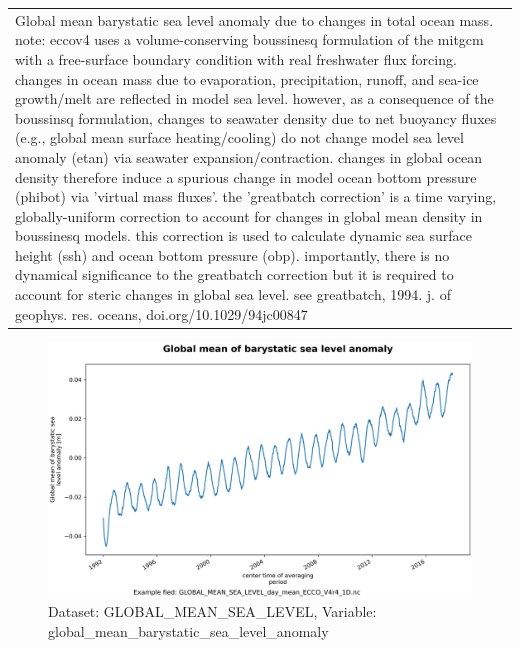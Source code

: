 \begin{longtable}{|m{}|m{}|m{}|m{}|}
\rowcolor{lightgray} \multicolumn{4}{|c|}{\textbf{Comments}} \\ \hline
\multicolumn{4}{|p{1\textwidth}|}{Global mean barystatic sea level anomaly due to changes in total ocean mass. note: eccov4 uses a volume-conserving boussinesq formulation of the mitgcm with a free-surface boundary condition with real freshwater flux forcing. changes in ocean mass due to evaporation, precipitation, runoff, and sea-ice growth/melt are reflected in model sea level. however, as a consequence of the boussinsq formulation, changes to seawater density due to net buoyancy fluxes (e.g., global mean surface heating/cooling) do not change model sea level anomaly (etan) via seawater expansion/contraction. changes in global ocean density therefore induce a spurious change in model ocean bottom pressure (phibot) via 'virtual mass fluxes'. the 'greatbatch correction' is a time varying, globally-uniform correction to account for changes in global mean density in boussinesq models. this correction is used to calculate dynamic sea surface height (ssh) and ocean bottom pressure (obp). importantly, there is no dynamical significance to the greatbatch correction but it is required to account for steric changes in global sea level. see greatbatch, 1994. j. of geophys. res. oceans, doi.org/10.1029/94jc00847} \\ \hline
\end{longtable}

\begin{figure}[H]
\centering
\includegraphics[scale=0.55]{../images/plots/oneD_plots/Global_Mean_Sea_Level/global_mean_barystatic_sea_level_anomaly.png}
\caption{Dataset: GLOBAL\_MEAN\_SEA\_LEVEL, Variable: global\_mean\_barystatic\_sea\_level\_anomaly}
\label{tab:table-GLOBAL_MEAN_SEA_LEVEL_global_mean_barystatic_sea_level_anomaly-Plot}
\end{figure}
\pagebreak
